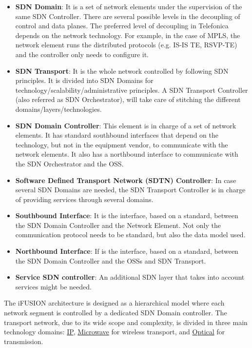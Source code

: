 \documentclass[a4paper,fleqn]{cas-dc}
\begin{document}
\begin{itemize}
\item \textbf{SDN Domain}: It is a set of network elements under the supervision of the same SDN Controller. There are several possible levels in the decoupling of control and data planes. The preferred level of decoupling in Telefonica depends on the network technology. For example, in the case of MPLS, the network element runs the distributed protocols (e.g. IS-IS TE, RSVP-TE) and the controller only needs to configure it.

\item \textbf{SDN Transport}: It is the whole network controlled by following SDN principles. It is divided into SDN Domains for technology/scalability/administrative principles. A SDN Transport Controller (also referred as SDN Orchestrator), will take care of stitching the different domains/layers/technologies.

\item \textbf{SDN Domain Controller}: This element is in charge of a set of network elements. It has standard southbound interfaces that depend on the technology, but not in the equipment vendor, to communicate with the network elements. It also has a northbound interface to communicate with the SDN Orchestrator and the OSS.

\item \textbf{Software Defined Transport Network (SDTN) Controller}: In case several SDN Domains are needed, the SDN Transport Controller is in charge of providing services through several domains. 

\item \textbf{Southbound Interface}: It is the interface, based on a standard, between the SDN Domain Controller and the Network Element. Not only the communication protocol needs to be standard, but also the data model used.

\item \textbf{Northbound Interface}: If is the interface, based on a standard, between the SDN Domain Controller and the OSSs and SDN Transport.

\item \textbf{Service SDN controller}: An additional SDN layer that takes into account services might be needed. 
\end{itemize}

The iFUSION architecture is designed as a hierarchical model where each network segment is controlled by a dedicated SDN Domain controller. The transport network, due to its wide scope and complexity, is divided in three main technology domains: \hyperref[section:ip]{IP}, \hyperref[section:mw]{Microwave} for wireless transport, and \hyperref[section:dwdm]{Optical} for transmission. 
\end{document}
